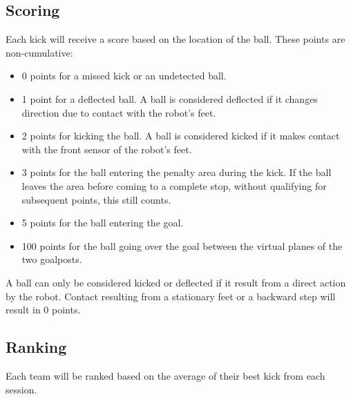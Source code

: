 \subsection{Scoring}

Each kick will receive a score based on the location of the ball.
These points are non-cumulative: 

\begin{itemize}
	\item 0 points for a missed kick or an undetected ball.
	\item 1 point for a deflected ball.
	A ball is considered deflected if it changes direction due to contact with the robot's feet.
	\item 2 points for kicking the ball.
	A ball is considered kicked if it makes contact with the front sensor of the robot's feet.
	\item 3 points for the ball entering the penalty area during the kick. 
	If the ball leaves the area before coming to a complete stop, without qualifying for subsequent points, this still counts. 
	\item 5 points for the ball entering the goal. 
	\item 100 points for the ball going over the goal between the virtual planes of the two goalposts. 
  \end{itemize}

  A ball can only be considered kicked or deflected if it result from a direct action by the robot.
  Contact resulting from a stationary feet or a backward step will result in 0 points.

  \subsection{Ranking}

  Each team will be ranked based on the average of their best kick from each session.